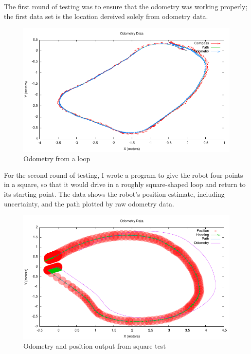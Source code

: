 The first round of testing was to ensure that the odometry was working properly; the first data set is the location dereived solely from odometry data.

\begin{figure}
\includegraphics{run-loop6}
\caption{Odometry from a loop}
\end{figure}

For the second round of testing, I wrote a program to give the robot four points in a square, so that it would drive in a roughly square-shaped loop and return to its starting point. The data shows the robot's position estimate, including uncertainty, and the path plotted by raw odometry data.

\begin{figure}
\includegraphics{run-2011-05-30-3}
\caption{Odometry and position output from square test}
\end{figure}

